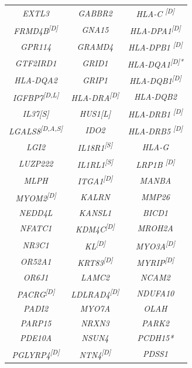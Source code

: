 \begin{refsection}
\begin{otherlanguage}{english}
\begin{scriptsize}
\begin{longtable}{ccc}
\textit{EXTL3} & \textit{GABBR2} & \textit{HLA-C		\textsuperscript{{[}D{]}}} \\
\textit{FRMD4B\textsuperscript{{[}D{]}}} & \textit{GNA15} & \textit{HLA-DPA1\textsuperscript{{[}D{]}}} \\
\textit{GPR114} & \textit{GRAMD4} & \textit{HLA-DPB1		\textsuperscript{{[}D{]}}} \\
\textit{GTF2IRD1} & \textit{GRID1} & \textit{HLA-DQA1\textsuperscript{{[}D{]}*}} \\
\textit{HLA-DQA2} & \textit{GRIP1} & \textit{HLA-DQB1\textsuperscript{{[}D{]}}} \\
\textit{IGFBP7\textsuperscript{{[}D,L{]}}} & \textit{HLA-DRA\textsuperscript{{[}D{]}}} & \textit{HLA-DQB2} \\
\textit{IL37{[}S{]}} & \textit{HUS1{[}L{]}} & \textit{HLA-DRB1	
\textsuperscript{{[}D{]}}} \\
\textit{LGALS8\textsuperscript{{[}D,A,S{]}}} & \textit{IDO2} & \textit{HLA-DRB5		\textsuperscript{{[}D{]}}} \\
\textit{LGI2} & \textit{IL18R1\textsuperscript{{[}S{]}}} & \textit{HLA-G} \\
\textit{LUZP222} & \textit{IL1RL1\textsuperscript{{[}S{]}}} & \textit{LRP1B		\textsuperscript{{[}D{]}}} \\
\textit{MLPH} & \textit{ITGA1\textsuperscript{{[}D{]}}} & \textit{MANBA} \\
\textit{MYOM2\textsuperscript{{[}D{]}}} & \textit{KALRN} & \textit{MMP26} \\
\textit{NEDD4L} & \textit{KANSL1} & \textit{BICD1} \\
\textit{NFATC1} & \textit{KDM4C\textsuperscript{{[}D{]}}} & \textit{MROH2A} \\
\textit{NR3C1} & \textit{KL\textsuperscript{{[}D{]}}} & \textit{MYO3A\textsuperscript{{[}D{]}}} \\
\textit{OR52A1} & \textit{KRT83\textsuperscript{{[}D{]}}} & \textit{MYRIP\textsuperscript{{[}D{]}}} \\
\textit{OR6J1} & \textit{LAMC2} & \textit{NCAM2} \\
\textit{PACRG\textsuperscript{{[}D{]}}} & \textit{LDLRAD4\textsuperscript{{[}D{]}}} & \textit{NDUFA10} \\
\textit{PADI2} & \textit{MYO7A} & \textit{OLAH} \\
\textit{PARP15} & \textit{NRXN3} & \textit{PARK2} \\
\textit{PDE10A} & \textit{NSUN4} & \textit{PCDH15*} \\
\textit{PGLYRP4\textsuperscript{{[}D{]}}} & \textit{NTN4\textsuperscript{{[}D{]}}} & \textit{PDSS1} \\

\end{longtable}
\end{scriptsize}
\end{otherlanguage}
\end{refsection}
